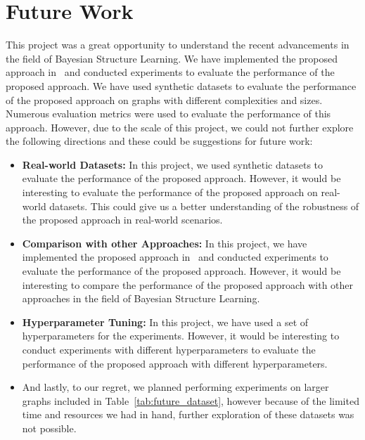 \documentclass{lxaiproposal}
\begin{document}
    \section{Future Work}\label{sec:future_work}
    \vspace*{-3mm}

    This project was a great opportunity to understand the recent advancements in the field of Bayesian Structure
    Learning. We have implemented the proposed approach in~\cite{deleu2022daggflownet} and conducted experiments to
    evaluate the performance of the proposed approach. We have used synthetic datasets to evaluate the performance of
    the proposed approach on graphs with different complexities and sizes. Numerous evaluation metrics were used to
    evaluate the performance of this approach. However, due to the scale of this project, we could not further
    explore the following directions and these could be suggestions for future work:

    \begin{itemize}
        \item \textbf{Real-world Datasets:} In this project, we used synthetic datasets to evaluate the performance of
        the proposed approach. However, it would be interesting to evaluate the performance of the proposed approach
        on real-world datasets. This could give us a better understanding of the robustness of the proposed approach
        in real-world scenarios.
        \item \textbf{Comparison with other Approaches:} In this project, we have implemented the proposed approach
        in~\cite{deleu2022daggflownet} and conducted experiments to evaluate the performance of the proposed approach.
        However, it would be interesting to compare the performance of the proposed approach with other approaches in
        the field of Bayesian Structure Learning.
        \item \textbf{Hyperparameter Tuning:} In this project, we have used a set of hyperparameters for the
        experiments. However, it would be interesting to conduct experiments with different hyperparameters to
        evaluate the performance of the proposed approach with different hyperparameters.
        \item And lastly, to our regret, we planned performing experiments on larger graphs included in
        Table~\ref{tab:future_dataset}, however because of the limited time and resources we had in hand,
        further exploration of these datasets was not possible.
    \end{itemize}
\end{document}

